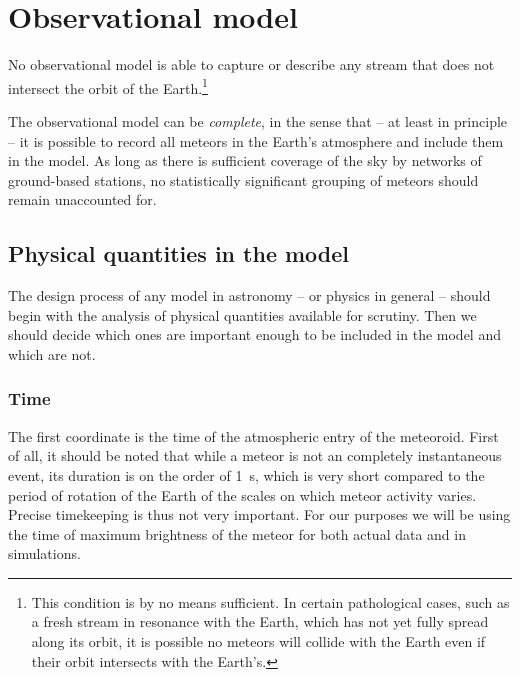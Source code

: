 
\section{Observational model} \label{ms}

    No observational model is able to capture or describe any stream that does not intersect the orbit of the
    Earth.\footnote{This condition is by no means sufficient. In certain pathological cases, such as a fresh stream in resonance
    with the Earth, which has not yet fully spread along its orbit, it is possible no meteors will collide with the Earth even
    if their orbit intersects with the Earth's.}

    The observational model can be \emph{complete}, in the sense that -- at least in principle -- it
    is possible to record all meteors in the Earth's atmosphere and include them in the model.
    As long as there is sufficient coverage of the sky by networks of ground-based stations,
    no statistically significant grouping of meteors should remain unaccounted for.

    \subsection{Physical quantities in the model} \label{msp}
        The design process of any model in astronomy -- or physics in general -- should begin with the analysis
        of physical quantities available for scrutiny. Then we should decide which ones are important enough
        to be included in the model and which are not.

        \subsubsection{Time} \label{mspt}
            The first coordinate is the time of the atmospheric entry of the meteoroid.
            First of all, it should be noted that while a meteor is not an completely instantaneous event,
            its duration is on the order of \SI{1}{\second}, which is very short compared to the
            period of rotation of the Earth of the scales on which meteor activity varies.
            Precise timekeeping is thus not very important.
            For our purposes we will be using the time of maximum brightness
            of the meteor for both actual data and in simulations.

